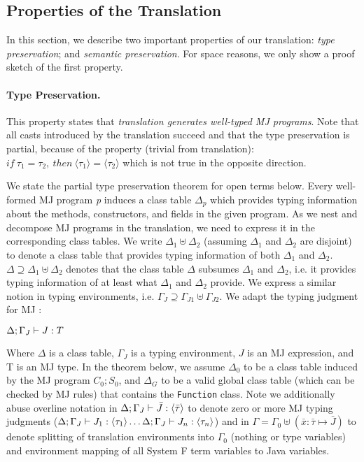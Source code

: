 \subsection{Properties of the Translation}
In this section, we describe two important properties of our translation:
\emph{type preservation}; and 
\emph{semantic preservation}. For space reasons, we only show a proof sketch
of the first property.
\paragraph{Type Preservation.}
This property states that \emph{translation generates well-typed MJ programs}. Note that
all casts introduced by the translation succeed and that the type preservation is partial,
because of the property (trivial from translation): 
$if~\tau_1=\tau_2,~then~ \langle\tau_1\rangle=\langle\tau_2\rangle$ which is not true
in the opposite direction.
 
We state the partial type preservation theorem for open terms below. Every well-formed
MJ program \emph{p} induces a class table $\Delta_p$ \cite{bierman03imperative} which provides
typing information about the methods, constructors, and fields in the given program.
As we nest and decompose MJ programs in the translation, we need to express it in the
corresponding class tables. We write $\Delta_1 \uplus \Delta_2$ (assuming $\Delta_1$ and
$\Delta_2$ are disjoint) to denote a class table that provides typing information of both
$\Delta_1$ and $\Delta_2$. $\Delta \supseteq \Delta_1 \uplus \Delta_2$ denotes
that the class table $\Delta$ subsumes $\Delta_1$ and $\Delta_2$, i.e. it provides typing
information of at least what $\Delta_1$ and $\Delta_2$ provide. We express a similar notion
in typing environments, i.e. $\Gamma_J \supseteq \Gamma_{J1} \uplus \Gamma_{J2}$.
We adapt the typing judgment for MJ \cite{bierman03imperative}:

$\Delta;\Gamma_J \vdash J : T$

Where $\Delta$ is a class table, $\Gamma_J$ is a typing environment, $J$ is an MJ expression,
and T is an MJ type. In the theorem below, we assume $\Delta_0$ to be a class table induced 
by the MJ program $C_0;S_0$, and $\Delta_G$ to be a valid global class table (which can be checked by MJ rules) 
that contains the \texttt{Function} class. Note we additionally abuse
overline notation in $\Delta;\Gamma_J \vdash \bar{J} : \langle\bar{\tau}\rangle$ to denote
zero or more MJ typing judgments ($\Delta;\Gamma_J \vdash J_1 : \langle\tau_1\rangle\dots\Delta;\Gamma_J \vdash J_n : \langle\tau_n\rangle$)
and in $\Gamma = \Gamma_0 \uplus (\bar{x}:\bar{\tau}\mapsto \bar{J})$ 
to denote splitting of translation environments into $\Gamma_0$ (nothing or type variables)
 and environment mapping of all System F term variables to Java variables.  
 
